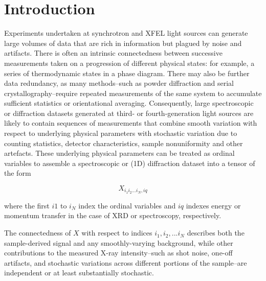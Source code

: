 \documentclass[12pt]{iopart}
\begin{document}
\section{Introduction}
Experiments undertaken at synchrotron and XFEL light sources can generate large volumes of data that are rich in information but plagued by noise and artifacts. There is often an intrinsic connectedness between successive measurements taken on a progression of different physical states: for example, a series of thermodynamic states in a phase diagram. There may also be further data redundancy, as many methods--such as powder diffraction and serial crystallography--require repeated measurements of the same system to accumulate sufficient statistics or orientational averaging. Consequently, large spectroscopic or diffraction datasets generated at third- or fourth-generation light sources are likely to contain sequences of measurements that combine smooth variation with respect to underlying physical parameters with stochastic variation due to counting statistics, detector characteristics, sample nonuniformity and other artefacts. 
These underlying physical parameters can be treated as ordinal variables to assemble a spectroscopic or (1D) diffraction dataset into a tensor of the form 

\begin{equation}
X_{i_1i_2...i_N, iq}
\end{equation}

where the first $i1$ to $i_N$ index the ordinal variables and $iq$ indexes energy or momentum transfer in the case of XRD or spectroscopy,
respectively. 
%

The connectedness of $X$ with respect to indices $i_1, i_2, ... i_N$ describes both the sample-derived signal and any smoothly-varying
background, while other contributions to the measured X-ray
intensity--such as shot noise, one-off artifacts, and stochastic
variations across different portions of the sample--are independent or
at least substantially stochastic. 
\end{document}
